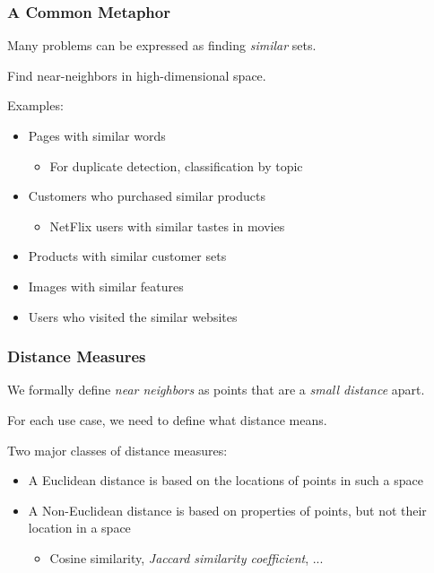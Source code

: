 \documentclass[svgnames]{beamer}
\begin{document}
\begin{frame} \frametitle{A Common Metaphor}

Many problems can be expressed as finding \emph{similar} sets.

Find near-neighbors in high-dimensional space.

\begin{block}{Examples:}
  \begin{itemize}
  \item Pages with similar words
    \begin{itemize}
    \item For duplicate detection, classification by topic
    \end{itemize}
  \item Customers who purchased similar products
    \begin{itemize}
    \item NetFlix users with similar tastes in movies
    \end{itemize}
  \item Products with similar customer sets
  \item Images with similar features
  \item Users who visited the similar websites
  \end{itemize}
\end{block}
\end{frame}

  
\begin{frame} \frametitle{Distance Measures}

We formally define \emph{near neighbors} as points that are a \emph{small distance} apart.

For each use case, we need to define what distance means.

\begin{block}{Two major classes of distance measures:}
  \begin{itemize}
  \item A Euclidean distance is based on the locations of points in such a space
  \item A Non-Euclidean distance is based on properties of points, but not their location in a space
    \begin{itemize}
    \item Cosine similarity, \emph{Jaccard similarity coefficient}, ...
    \end{itemize}
  \end{itemize}
\end{block}  
\end{frame}
\end{document}
